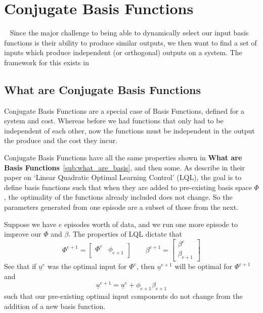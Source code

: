
\FloatBarrier\section{Conjugate Basis Functions}
~\label{sec:conjugate_basis_functions}
Since the major challenge to being able to dynamically select our input basis functions is their ability to produce similar outputs, we then want to find a set of inputs which produce independent (or orthogonal) outputs on a system. The framework for this exists in 

\FloatBarrier\subsection{What are Conjugate Basis Functions}
Conjugate Basis Functions are a special case of Basis Functions, defined for a system and cost. Whereas before we had functions that only had to be independent of each other, now the functions must be independent in the output the produce and the cost they incur. 

Conjugate Basis Functions have all the same properties shown in \textbf{What are Basis Functions}~\ref{sub:what_are_basis}, and then some. As  describe in their paper on `Linear Quadratic Optimal Learning Control' (LQL), the goal is to define basis functions such that when they are added to pre-existing basis space $\Phi$, the optimality of the functions already included does not change. So the parameters generated from one episode are a subset of those from the next.

Suppose we have $e$ episodes worth of data, and we run one more episode to improve our $\Phi$ and $\beta$. The properties of LQL dictate that
\begin{equation}
    \Phi^{e+1} = \begin{bmatrix}
        \Phi^e & \phi_{e+1}
    \end{bmatrix}
    \quad\quad
    \beta^{e+1} = \begin{bmatrix}
        \beta^e \\ \beta_{e+1}
    \end{bmatrix}
    \label{eq:conjugate_subspace}
\end{equation}
See that if $\underline{u}^e$ was the optimal input for $\Phi^e$, then $\underline{u}^{e+1}$ will be optimal for $\Phi^{e+1}$ and
\begin{equation}
    \underline{u}^{e+1} = \underline{u}^e + \phi_{e+1}\beta_{e+1}
\end{equation}
such that our pre-existing optimal input components do not change from the addition of a new basis function. 

